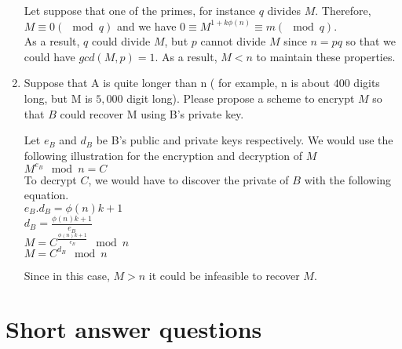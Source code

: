 \documentclass[12]{article}
\begin{document}
\begin{enumerate}
	 Let suppose that one of the primes, for instance $q$ divides $M$. Therefore,	$M \equiv 0 (  \mod q ) $ and we have $ 0 \equiv M^{1 + k\phi(n)} \equiv m ( \mod q )$. \\
	 As a result, $q$ could divide $M$, but $p$ cannot divide $M$ since $n = pq$ so that we could have  $gcd(M, p) = 1$. As a result, $M < n$ to maintain these properties.
	
	\item Suppose that A is quite longer than n ( for example, n is about $400$ digits long, but M is  $5,000$  digit long). Please propose a scheme to encrypt $M$ so that $B$ could recover M using B's private key.
	
	Let $e_B$ and $d_B$ be B's public and private keys respectively. We would use the following illustration for the encryption and decryption of  $M$ \\
	$M^{e_B} \mod n = C $ \\
	
	To decrypt $C$, we would have to discover the private of $B$ with the following equation. \\
	
	$e_B.d_B = \phi(n)k + 1$  \\
	$d_B = \frac{\phi(n)k + 1 }{ e_B }$ \\
	$M = C^{\frac{\phi(n)k + 1 }{e_B}}  \mod n $ \\
	$M = C^{d_B} \mod  n$
	
	Since in this case, $M > n$  it could be infeasible to recover $M$.
	
\end{enumerate}
	
\section{ Short answer questions }	
\end{document}
